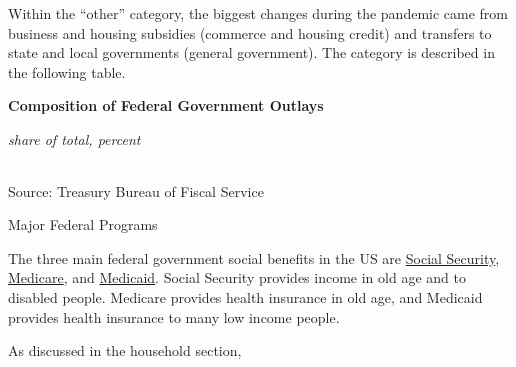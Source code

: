 \documentclass{report}
\begin{document}
{\begin{minipage}{0.76\textwidth}


\end{minipage}
\newpage
\begin{minipage}{0.76\textwidth}  
\small 

Within the ``other'' category, the biggest changes during the pandemic came from business and housing subsidies (commerce and housing credit) and transfers to state and local governments (general government). The category is described in the following table. 
\vspace{1mm}

\normalsize \textbf{Composition of Federal Government Outlays}\\
\footnotesize{\textit{share of total, percent}
\vspace*{-4mm}

 \setlength{\tabcolsep}{1.2pt} \color{black!90}
{\renewcommand{\arraystretch}{1.55}
\hspace*{-2mm} \begin{tabular}{p{58mm} R{9.0mm} R{9.0mm} R{9.0mm} R{9.0mm} R{9.0mm} R{9.0mm}}
		 \hline
	\end{tabular}
}}
		
\vspace{-2mm}
\footnotesize{Source: Treasury Bureau of Fiscal Service}
\end{minipage}
\newpage
\begin{minipage}{0.76\textwidth}      
\normalsize Major Federal Programs
\vspace{-1mm}

\small The three main federal government social benefits in the US are \href{https://www.ssa.gov/about-ssa}{Social Security}, \href{https://www.medicare.gov/what-medicare-covers/your-medicare-coverage-choices/whats-medicare}{Medicare}, and \href{https://www.medicaid.gov/medicaid/index.html}{Medicaid}. Social Security provides income in old age and to disabled people. Medicare provides health insurance in old age, and Medicaid provides health insurance to many low income people. 

As discussed in the household section,  
\end{minipage}
\vspace{1mm}

}
\end{document}
